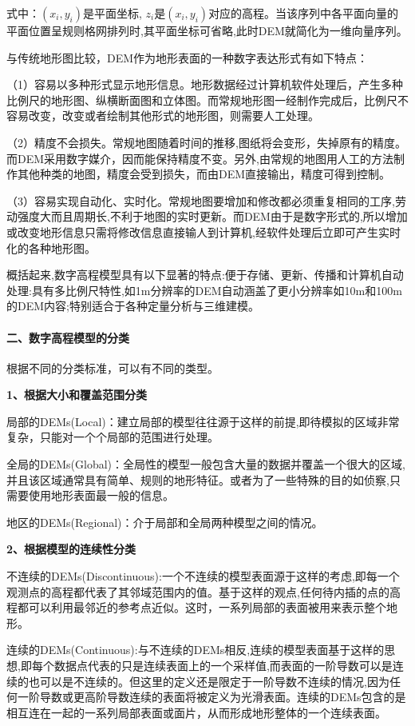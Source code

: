 式中：\((x_i, y_i)\)是平面坐标,
\(z_i\)是\((x_i, y_i)\)对应的高程。当该序列中各平面向量的平面位置呈规则格网排列时,其平面坐标可省略,此时DEM就简化为一维向量序列。

与传统地形图比较，DEM作为地形表面的一种数字表达形式有如下特点：

（1）容易以多种形式显示地形信息。地形数据经过计算机软件处理后，产生多种比例尺的地形图、纵横断面图和立体图。而常规地形图一经制作完成后，比例尺不容易改变，改变或者绘制其他形式的地形图，则需要人工处理。

（2）精度不会损失。常规地图随着时间的推移,图纸将会变形，失掉原有的精度。而DEM采用数字媒介，因而能保持精度不变。另外,由常规的地图用人工的方法制作其他种类的地图，精度会受到损失，而由DEM直接输出，精度可得到控制。

（3）容易实现自动化、实时化。常规地图要增加和修改都必须重复相同的工序,劳动强度大而且周期长,不利于地图的实时更新。而DEM由于是数字形式的,所以增加或改变地形信息只需将修改信息直接输人到计算机,经软件处理后立即可产生实时化的各种地形图。

概括起来,数字高程模型具有以下显著的特点:便于存储、更新、传播和计算机自动处理:具有多比例尺特性,如1m分辨率的DEM自动涵盖了更小分辨率如10m和100m的DEM内容;特别适合于各种定量分析与三维建模。

\paragraph{二、数字高程模型的分类}\label{ux4e8cux6570ux5b57ux9ad8ux7a0bux6a21ux578bux7684ux5206ux7c7b}

根据不同的分类标准，可以有不同的类型。

\textbf{1、根据大小和覆盖范围分类}

局部的DEMs(Local)：建立局部的模型往往源于这样的前提,即待模拟的区域非常复杂，只能对一个个局部的范围进行处理。

全局的DEMs(Global)：全局性的模型一般包含大量的数据并覆盖一个很大的区域,并且该区域通常具有简单、规则的地形特征。或者为了一些特殊的目的如侦察,只需要使用地形表面最一般的信息。

地区的DEMs(Regional)：介于局部和全局两种模型之间的情况。

\textbf{2、根据模型的连续性分类}

不连续的DEMs(Discontinuous):一个不连续的模型表面源于这样的考虑,即每一个观测点的高程都代表了其邻域范围内的值。基于这样的观点,任何待内插的点的高程都可以利用最邻近的参考点近似。这时，一系列局部的表面被用来表示整个地形。

连续的DEMs(Continuous):与不连续的DEMs相反,连续的模型表面基于这样的思想,即每个数据点代表的只是连续表面上的一个采样值,而表面的一阶导数可以是连续的也可以是不连续的。但这里的定义还是限定于一阶导数不连续的情况,因为任何一阶导数或更高阶导数连续的表面将被定义为光滑表面。连续的DEMs包含的是相互连在一起的一系列局部表面或面片，从而形成地形整体的一个连续表面。

